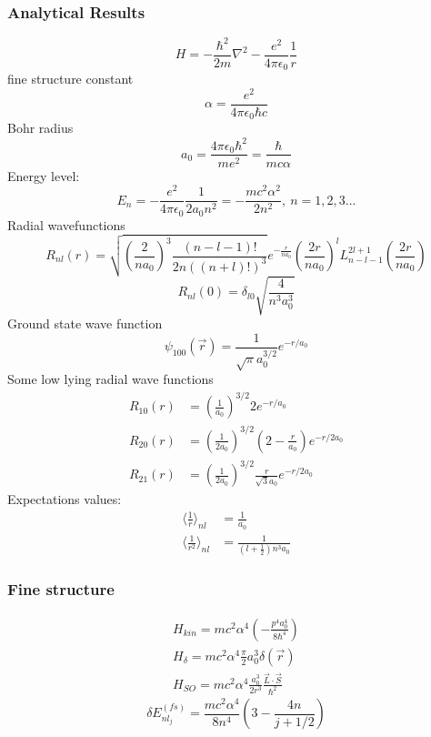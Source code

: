 \documentclass{article}
\begin{document}
\subsubsection{Analytical Results}
\begin{equation}
H = -\frac{\hbar^2}{2m}\nabla^2-\frac{e^2}{4\pi\epsilon_0}\frac{1}r
\end{equation}
fine structure constant
\begin{equation}
\alpha = \frac{e^2}{4\pi\epsilon_0\hbar c}
\end{equation}
Bohr radius
\begin{equation}
a_0=\frac{4\pi\epsilon_0\hbar^2}{me^2}=\frac{\hbar}{mc\alpha}
\end{equation}
Energy level:
\begin{equation}
E_n=-\frac{e^2}{4\pi\epsilon_0}\frac{1}{2a_0n^2}=-\frac{mc^2\alpha^2}{2n^2},\ n=1,2,3...
\end{equation}
Radial wavefunctions
\begin{equation}
R_{nl}(r)=\sqrt{(\frac{2}{na_0})^3\frac{(n-l-1)!}{2n((n+l)!)^3}}e^{-\frac{r}{na_0}}(\frac{2r}{na_0})^lL_{n-l-1}^{2l+1}(\frac{2r}{na_0})
\end{equation}
\begin{equation}
	R_{nl}(0)=\delta_{l0}\sqrt{\frac{4}{n^3a_0^3}}
\end{equation}
Ground state wave function
\begin{equation}
	\psi_{100}(\vec r)=\frac{1}{\sqrt{\pi}a_0^{3/2}}e^{-r/a_0}
\end{equation}
Some low lying radial wave functions
\begin{subequations}
\begin{align}
	R_{10}(r)&=(\frac{1}{a_0})^{3/2}2e^{-r/a_0}\\
	R_{20}(r)&=(\frac{1}{2a_0})^{3/2}(2-\frac{r}{a_0})e^{-r/2a_0}\\
	R_{21}(r)&=(\frac{1}{2a_0})^{3/2}\frac{r}{\sqrt{3}a_0}e^{-r/2a_0}
\end{align}
\end{subequations}
Expectations values:
\begin{subequations}
\begin{align}
\langle \frac{1}{r}\rangle_{nl}&=\frac{1}{a_0}\\
\langle \frac{1}{r^2}\rangle_{nl}&=\frac{1}{(l+\frac{1}{2})n^3a_0}
\end{align}
\end{subequations}
\subsubsection{Fine structure}
\begin{subequations}
\begin{align}
H_{kin}=mc^2\alpha^4(-\frac{p^4a_0^4}{8\hbar^4})\\
H_\delta = mc^2\alpha^4\frac{\pi}{2}a_0^3\delta(\vec r)\\
H_{SO} = mc^2\alpha^4\frac{a_0^3}{2r^3}\frac{\vec L \cdot \vec S}{\hbar^2}
\end{align}
\end{subequations}
\begin{equation}
\delta E_{nl_j}^{(fs)}=\frac{mc^2\alpha^4}{8n^4}(3-\frac{4n}{j+1/2})
\end{equation}
\end{document}
